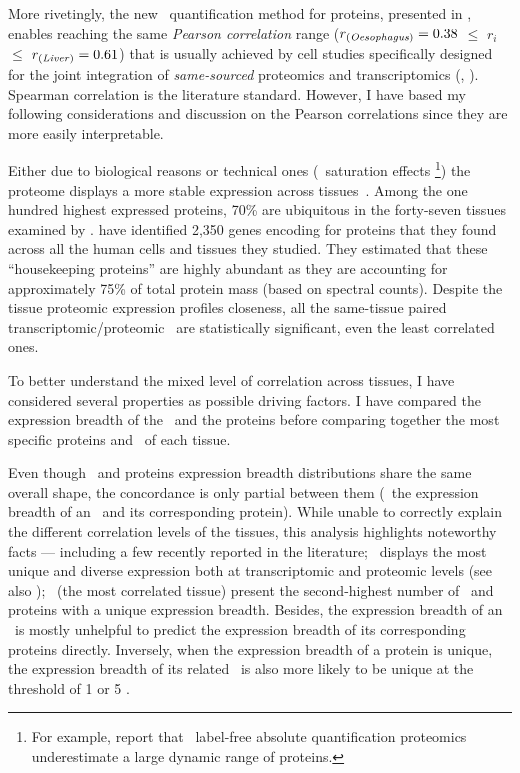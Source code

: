 More rivetingly,
the new \PPKM\ quantification method for proteins,
presented in ,
enables reaching the same \emph{Pearson correlation} range
($r_{\text{(\emph{Oesophagus})}}=0.38$ $≤$ $r_i$  $≤$ $r_{\text{(\emph{Liver})}}=0.61$)
that is usually achieved by cell studies specifically designed
for the joint integration of \emph{same-sourced} proteomics and transcriptomics
(\eg, \citet{Marguerat2012-sn,schwanhausserglobal:2011,Schwanhausser2013-et,Li2014-ai}).
Spearman correlation is the literature standard.
However, I have based my following considerations and discussion
on the Pearson correlations
since they are more easily interpretable.

Either due to biological reasons or technical ones (\eg\ saturation effects%
\footnote{For example, \citet{TOP3isbetter} report that
\ms\ label-free absolute quantification proteomics underestimate
a large dynamic range of proteins.})
the proteome displays a more stable expression across
tissues~.
Among the one hundred highest expressed proteins,
70\% are ubiquitous in the forty-seven tissues examined by \citet{KusterData}.
\citet{PandeyData} have identified 2,350 genes encoding for proteins
that they found across all the human cells and tissues they studied.
They estimated that these \enquote{housekeeping proteins} are
highly abundant as they are accounting for approximately 75\% of total protein mass
(based on spectral counts).
Despite the tissue proteomic expression profiles closeness,
all the same-tissue paired transcriptomic/proteomic \treps\
are statistically significant, even the least correlated ones.

To better understand the mixed level of correlation across tissues,
I have considered several properties as possible driving factors.
I have compared the expression breadth of the \mRNAs\ and the proteins
before comparing together the most specific proteins and \mRNAs\ of each tissue.\mybr\

Even though \mRNAs\ and proteins expression breadth distributions share
the same overall shape,
the concordance is only partial between them
(\ie\ the expression breadth of an \mRNA\ and its corresponding protein).
While unable to correctly explain the different correlation levels of the tissues,
this analysis highlights noteworthy facts
--- including a few recently reported in the literature;
\testis\ displays the most unique and diverse expression
both at transcriptomic and proteomic levels
(see also \citet{Wang2019-ut,Zhang2015-yn});
\liver\ (the most correlated tissue) present the second-highest number
of \mRNAs\ and proteins with a unique expression breadth.
Besides, the expression breadth of an \mRNA\ is mostly unhelpful
to predict the expression breadth of its corresponding proteins directly.
Inversely, when the expression breadth of a protein is unique,
the expression breadth of its related \mRNA\ is also more likely to be unique
at the threshold of 1 or 5 \FPKM{}.

